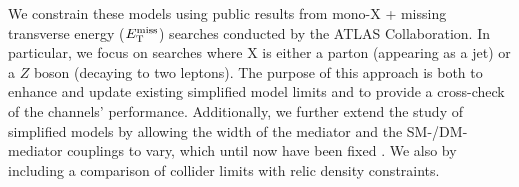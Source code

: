 \begin{flushleft}
We constrain these models using public results from mono-X + missing transverse energy ($E_{\mathrm{T}}^{\mathrm{miss}}$) searches conducted by the ATLAS Collaboration. In particular, we focus on searches where X is either a parton (appearing as a jet) or a $Z$ boson (decaying to two leptons). The purpose of this approach is both to enhance and update existing simplified model limits \cite{} and to provide a cross-check of the channels' performance. Additionally, we further extend the study of simplified models by allowing the width of the mediator and the SM-/DM-mediator couplings to vary, which until now have been fixed \cite{}. We also  by including a comparison of collider limits with relic density constraints.
\bigskip





\end{flushleft}
